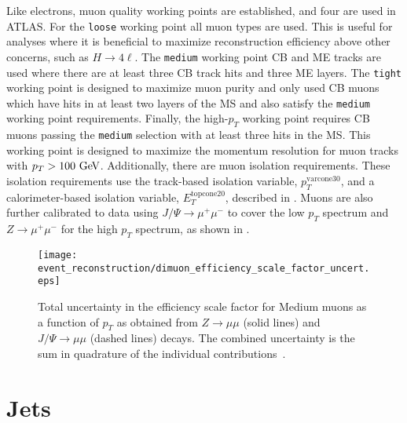 Like electrons, muon quality working points are established, and four are used in ATLAS.
For the \texttt{loose} working point all muon types are used.
This is useful for analyses where it is beneficial to maximize reconstruction efficiency above other concerns, such as $H \to 4\ell$.
The \texttt{medium} working point CB and ME tracks are used where there are at least three CB track hits and three ME layers.
The \texttt{tight} working point is designed to maximize muon purity and only used CB muons which have hits in at least two layers of the MS and also satisfy the \texttt{medium} working point requirements.
Finally, the high-$p_{T}$ working point requires CB muons passing the \texttt{medium} selection with at least three hits in the MS.
This working point is designed to maximize the momentum resolution for muon tracks with $p_{T} > 100~\text{Ge\kern-0.1em V}$.
Additionally, there are muon isolation requirements.
These isolation requirements use the track-based isolation variable, $p_{T}^{\mathrm{varcone30}}$, and a calorimeter-based isolation variable, $E_{T}^{\mathrm{topcone20}}$, described in .
Muons are also further calibrated to data using $J/\Psi \to \mu^{+}\mu^{-}$ to cover the low $p_{T}$ spectrum and $Z \to \mu^{+}\mu^{-}$ for the high $p_{T}$ spectrum, as shown in .

\begin{figure}[htbp]
 \centering
 \texttt{[image: event\_reconstruction/dimuon\_efficiency\_scale\_factor\_uncert.eps]}
 \caption[Total uncertainty in the efficiency scale factor for Medium muons as a function of $p_{T}$ as obtained from $Z\to\mu\mu$ and $J/\Psi \to \mu\mu$ decays.]{%
  Total uncertainty in the efficiency scale factor for Medium muons as a function of $p_{T}$ as obtained from $Z\to\mu\mu$ (solid lines) and $J/\Psi \to \mu\mu$ (dashed lines) decays.
  The combined uncertainty is the sum in quadrature of the individual contributions~\cite{PERF-2015-10}.}
 \label{fig:dimuon_efficiency_scale_factor_uncert}
\end{figure}

\section{Jets}\label{section:jets}

